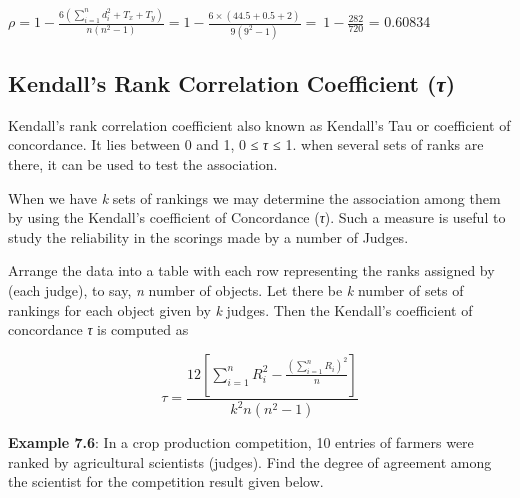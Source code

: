\documentclass[
]{book}
\begin{document}
\(\rho = 1 - \frac{6\left( \sum_{i = 1}^{n}d_{i}^{2} + T_{x} + T_{y} \right)}{n\left( n^{2} - 1 \right)} = 1 - \frac{6 \times \left( 44.5 + 0.5 + 2 \right)}{9\left( 9^{2} - 1 \right)} = \ 1 - \frac{282}{720}\)
= 0.60834

\subsection{\texorpdfstring{Kendall's Rank Correlation Coefficient (\emph{τ})}{Kendall's Rank Correlation Coefficient (τ)}}\label{kendalls-rank-correlation-coefficient-ux3c4}

Kendall's rank correlation coefficient also known as Kendall's Tau or
coefficient of concordance. It lies between 0 and 1, 0 ≤ \emph{τ ≤} 1. when
several sets of ranks are there, it can be used to test the association.

When we have \emph{k} sets of rankings we may determine the association among
them by using the Kendall's coefficient of Concordance (\emph{τ}). Such a
measure is useful to study the reliability in the scorings made by a
number of Judges.

Arrange the data into a table with each row representing the ranks
assigned by (each judge), to say, \emph{n} number of objects. Let there be
\emph{k} number of sets of rankings for each object given by \emph{k} judges. Then
the Kendall's coefficient of concordance \emph{τ} is computed as

\[\tau = \frac{12\left\lbrack \sum_{i = 1}^{n}{R_{i}^{2} - \frac{\left( \sum_{i = 1}^{n}R_{i} \right)^{2}}{n}} \right\rbrack}{k^{2}n\left( n^{2} - 1 \right)}\]

\textbf{Example 7.6}: In a crop production competition, 10 entries of farmers
were ranked by agricultural scientists (judges). Find the degree of
agreement among the scientist for the competition result given below.
\end{document}
